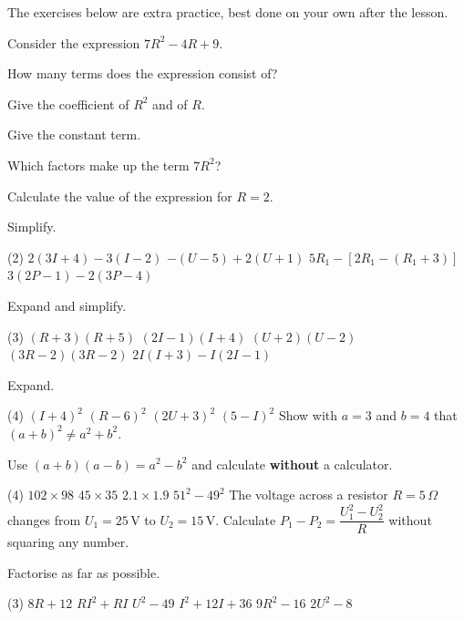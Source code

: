 The exercises below are extra practice, best done on your own after the lesson.

Consider the expression $7R^2 - 4R + 9$.
\begin{parts}
  \item How many terms does the expression consist of?
  \item Give the coefficient of $R^2$ and of $R$.
  \item Give the constant term.
  \item Which factors make up the term $7R^2$?
  \item Calculate the value of the expression for $R = 2$.
\end{parts}

Simplify.
\begin{delar}(2)
  \task $2(3I + 4) - 3(I - 2)$
  \task $-(U - 5) + 2(U + 1)$
  \task $5R_1 - \left[2R_1 - (R_1 + 3)\right]$
  \task $3(2P - 1) - 2(3P - 4)$
\end{delar}

Expand and simplify.
\begin{delar}(3)
  \task $(R + 3)(R + 5)$
  \task $(2I - 1)(I + 4)$
  \task $(U + 2)(U - 2)$
  \task $(3R - 2)(3R - 2)$
  \task $2I(I + 3) - I(2I - 1)$
\end{delar}

Expand.
\begin{delar}(4)
  \task $(I + 4)^2$
  \task $(R - 6)^2$
  \task $(2U + 3)^2$
  \task $(5 - I)^2$
  \task* Show with $a = 3$ and $b = 4$ that $(a + b)^2 \neq a^2 + b^2$.
\end{delar}

Use $(a + b)(a - b) = a^2 - b^2$ and calculate \textbf{without} a calculator.
\begin{delar}(4)
  \task $102 \times 98$
  \task $45 \times 35$
  \task $2.1 \times 1.9$
  \task $51^2 - 49^2$
  \task* The voltage across a resistor $R = 5\,\Omega$ changes from $U_1 = 25\,\text{V}$ to
    $U_2 = 15\,\text{V}$. Calculate $P_1 - P_2 = \dfrac{U_1^2 - U_2^2}{R}$ without squaring any
    number.
\end{delar}

Factorise as far as possible.
\begin{delar}(3)
  \task $8R + 12$
  \task $RI^2 + RI$
  \task $U^2 - 49$
  \task $I^2 + 12I + 36$
  \task $9R^2 - 16$
  \task $2U^2 - 8$
\end{delar}

